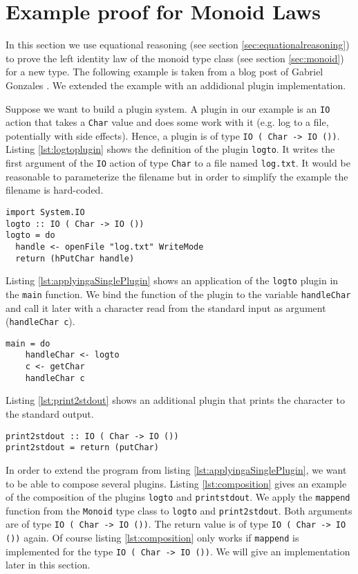 \section{Example proof for Monoid Laws}
\label{sec:example}
In this section we use equational reasoning (see section \ref{sec:equationalreasoning}) to prove the left identity law of the monoid type class (see section \ref{sec:monoid}) for a new type.
The following example is taken from a blog post of Gabriel Gonzales \cite{gonzales14}. We extended the example  with an addidional plugin implementation.

Suppose we want to build a plugin system. A plugin in our example is an \verb|IO| action that takes a \verb|Char| value and does some work with it (e.g. log to a file, potentially with side effects). Hence, a plugin is of type \verb|IO ( Char -> IO ())|. Listing \ref{lst:logtoplugin} shows the definition of the plugin \verb|logto|. It writes the first argument of the \verb|IO| action of type \verb|Char| to a file named \verb|log.txt|. It would be reasonable to parameterize the filename but in order to simplify the example the filename is hard-coded.

\begin{lstlisting}[caption={Definition of a plugin. It writes a character to a file.}, label={lst:logtoplugin}]
import System.IO
logto :: IO ( Char -> IO ())
logto = do
  handle <- openFile "log.txt" WriteMode
  return (hPutChar handle)
\end{lstlisting}

Listing \ref{lst:applyingaSinglePlugin} shows an application of the \verb|logto| plugin in the \verb|main| function. We bind the function of the plugin to the variable \verb|handleChar| and call it later with a character read from the standard input as argument (\verb|handleChar c|).

\begin{lstlisting}[caption={Calling the logto IO action in main}, label={lst:applyingaSinglePlugin}]
main = do
    handleChar <- logto
    c <- getChar
    handleChar c
\end{lstlisting}

Listing \ref{lst:print2stdout} shows an additional plugin that prints the character to the standard output. 

\begin{lstlisting}[caption={Definition of the plugin print2stdout}, label={lst:print2stdout}]
print2stdout :: IO ( Char -> IO ())
print2stdout = return (putChar)
\end{lstlisting}
In order to extend the program from listing \ref{lst:applyingaSinglePlugin}, we want to be able to compose several plugins.
Listing \ref{lst:composition} gives an example of the composition of the plugins \verb|logto| and \verb|printstdout|. We apply the \verb|mappend| function from the \verb|Monoid| type class to \verb|logto| and \verb|print2stdout|. Both arguments are of type \verb|IO ( Char -> IO ())|. The return value is of type \verb|IO ( Char -> IO ())| again. Of course listing \ref{lst:composition} only works if \verb|mappend| is implemented for the type \verb|IO ( Char -> IO ())|. We will give an implementation later in this section.

